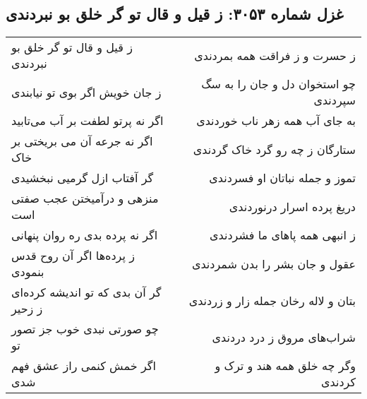 \begin{center}
\section*{غزل شماره ۳۰۵۳: ز قیل و قال تو گر خلق بو نبردندی}
\label{sec:3053}
\begin{longtable}{l p{0.5cm} r}
ز قیل و قال تو گر خلق بو نبردندی
&&
ز حسرت و ز فراقت همه بمردندی
\\
ز جان خویش اگر بوی تو نیابندی
&&
چو استخوان دل و جان را به سگ سپردندی
\\
اگر نه پرتو لطفت بر آب می‌تابید
&&
به جای آب همه زهر ناب خوردندی
\\
اگر نه جرعه آن می بریختی بر خاک
&&
ستارگان ز چه رو گرد خاک گردندی
\\
گر آفتاب ازل گرمیی نبخشیدی
&&
تموز و جمله نباتان او فسردندی
\\
منزهی و درآمیختن عجب صفتی است
&&
دریغ پرده اسرار درنوردندی
\\
اگر نه پرده بدی ره روان پنهانی
&&
ز انبهی همه پاهای ما فشردندی
\\
ز پرده‌ها اگر آن روح قدس بنمودی
&&
عقول و جان بشر را بدن شمردندی
\\
گر آن بدی که تو اندیشه کرده‌ای ز زحیر
&&
بتان و لاله رخان جمله زار و زردندی
\\
چو صورتی نبدی خوب جز تصور تو
&&
شراب‌های مروق ز درد دردندی
\\
اگر خمش کنمی راز عشق فهم شدی
&&
وگر چه خلق همه هند و ترک و کردندی
\\
\end{longtable}
\end{center}
